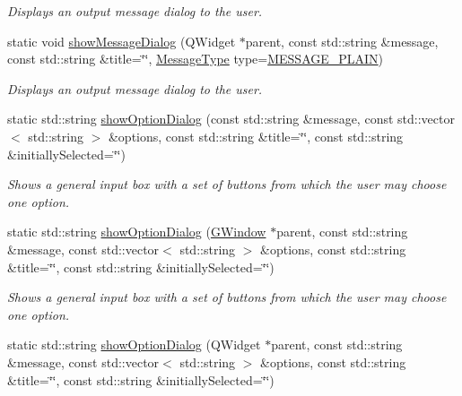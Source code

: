 \begin{DoxyCompactItemize}
\begin{DoxyCompactList}\small\item\em Displays an output message dialog to the user. \end{DoxyCompactList}\item 
static void \mbox{\hyperlink{classsgl_1_1GOptionPane_a2284af6ada78d0ddedfc5c2eaeea2d9b}{show\+Message\+Dialog}} (Q\+Widget $\ast$parent, const std\+::string \&message, const std\+::string \&title=\char`\"{}\char`\"{}, \mbox{\hyperlink{classsgl_1_1GOptionPane_ac6606ebe91c8ac66a2c314c79f5ab013}{Message\+Type}} type=\mbox{\hyperlink{classsgl_1_1GOptionPane_ac6606ebe91c8ac66a2c314c79f5ab013ac03a17c74c589b004d166532958a6196}{M\+E\+S\+S\+A\+G\+E\+\_\+\+P\+L\+A\+IN}})
\begin{DoxyCompactList}\small\item\em Displays an output message dialog to the user. \end{DoxyCompactList}\item 
static std\+::string \mbox{\hyperlink{classsgl_1_1GOptionPane_a97736128c635f83e29c7e9ca5721c497}{show\+Option\+Dialog}} (const std\+::string \&message, const std\+::vector$<$ std\+::string $>$ \&options, const std\+::string \&title=\char`\"{}\char`\"{}, const std\+::string \&initially\+Selected=\char`\"{}\char`\"{})
\begin{DoxyCompactList}\small\item\em Shows a general input box with a set of buttons from which the user may choose one option. \end{DoxyCompactList}\item 
static std\+::string \mbox{\hyperlink{classsgl_1_1GOptionPane_a7a5687c65c026d0b8ec1d6eb3307c152}{show\+Option\+Dialog}} (\mbox{\hyperlink{classsgl_1_1GWindow}{G\+Window}} $\ast$parent, const std\+::string \&message, const std\+::vector$<$ std\+::string $>$ \&options, const std\+::string \&title=\char`\"{}\char`\"{}, const std\+::string \&initially\+Selected=\char`\"{}\char`\"{})
\begin{DoxyCompactList}\small\item\em Shows a general input box with a set of buttons from which the user may choose one option. \end{DoxyCompactList}\item 
static std\+::string \mbox{\hyperlink{classsgl_1_1GOptionPane_acbb5578b03bc2715c63b175f6f7ffa24}{show\+Option\+Dialog}} (Q\+Widget $\ast$parent, const std\+::string \&message, const std\+::vector$<$ std\+::string $>$ \&options, const std\+::string \&title=\char`\"{}\char`\"{}, const std\+::string \&initially\+Selected=\char`\"{}\char`\"{})

\end{DoxyCompactItemize}

